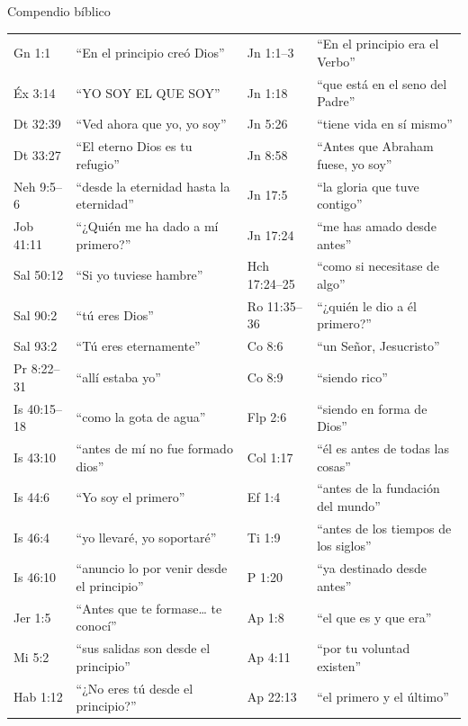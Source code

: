 \documentclass[hyperref={bookmarks=false},aspectratio=169]{beamer}
\begin{document}
\begin{frame}{Compendio bíblico}
\fontsize{6.2}{7.2}\selectfont\renewcommand{\arraystretch}{1.02}
\begin{tabular}{@{}>{\RaggedRight\arraybackslash}p{1.5cm}>{\RaggedRight\arraybackslash}p{4.1cm}|>{\RaggedRight\arraybackslash}p{1.5cm}>{\RaggedRight\arraybackslash}p{4.1cm}@{}}
\toprule
Gn 1:1 & ``En el principio creó Dios'' & Jn 1:1--3 & ``En el principio era el Verbo'' \\
Éx 3:14 & ``YO SOY EL QUE SOY'' & Jn 1:18 & ``que está en el seno del Padre'' \\
Dt 32:39 & ``Ved ahora que yo, yo soy'' & Jn 5:26 & ``tiene vida en sí mismo'' \\
Dt 33:27 & ``El eterno Dios es tu refugio'' & Jn 8:58 & ``Antes que Abraham fuese, yo soy'' \\
Neh 9:5--6 & ``desde la eternidad hasta la eternidad'' & Jn 17:5 & ``la gloria que tuve contigo'' \\
Job 41:11 & ``¿Quién me ha dado a mí primero?'' & Jn 17:24 & ``me has amado desde antes'' \\
Sal 50:12 & ``Si yo tuviese hambre'' & Hch 17:24--25 & ``como si necesitase de algo'' \\
Sal 90:2 & ``tú eres Dios'' & Ro 11:35--36 & ``¿quién le dio a él primero?'' \\
Sal 93:2 & ``Tú eres eternamente'' & 1 Co 8:6 & ``un Señor, Jesucristo'' \\
Pr 8:22--31 & ``allí estaba yo'' & 2 Co 8:9 & ``siendo rico'' \\
Is 40:15--18 & ``como la gota de agua'' & Flp 2:6 & ``siendo en forma de Dios'' \\
Is 43:10 & ``antes de mí no fue formado dios'' & Col 1:17 & ``él es antes de todas las cosas'' \\
Is 44:6 & ``Yo soy el primero'' & Ef 1:4 & ``antes de la fundación del mundo'' \\
Is 46:4 & ``yo llevaré, yo soportaré'' & 2 Ti 1:9 & ``antes de los tiempos de los siglos'' \\
Is 46:10 & ``anuncio lo por venir desde el principio'' & 1 P 1:20 & ``ya destinado desde antes'' \\
Jer 1:5 & ``Antes que te formase\ldots{} te conocí'' & Ap 1:8 & ``el que es y que era'' \\
Mi 5:2 & ``sus salidas son desde el principio'' & Ap 4:11 & ``por tu voluntad existen'' \\
Hab 1:12 & ``¿No eres tú desde el principio?'' & Ap 22:13 & ``el primero y el último'' \\
\bottomrule
\end{tabular}
\end{frame}
\end{document}

